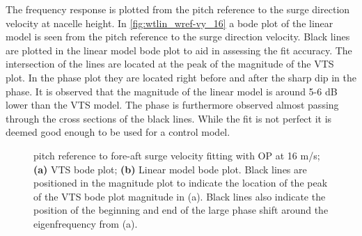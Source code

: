 The frequency response is plotted from the pitch reference to the surge direction velocity at nacelle height. In \cref{fig:wtlin_wref-vy_16} a bode plot of the linear model is seen from the pitch reference to the surge direction velocity. Black lines are plotted in the linear model bode plot to aid in assessing the fit accuracy. The intersection of the lines are located at the peak of the magnitude of the VTS plot. In the phase plot they are located right before and after the sharp dip in the phase. It is observed that the magnitude of the linear model is around 5-6 dB lower than the VTS model. The phase is furthermore observed almost passing through the cross sections of the black lines. While the fit is not perfect it is deemed good enough to be used for a control model.
\begin{figure}[ht]
	\centering
	
	\hfil
	
	\caption{pitch reference to fore-aft surge velocity fitting with OP at 16 m/s; \textbf{(a)} VTS bode plot; \textbf{(b)} Linear model bode plot. Black lines are positioned in the magnitude plot to indicate the location of the peak of the VTS bode plot magnitude in (a). Black lines also indicate the position of the beginning and end of the large phase shift around the eigenfrequency from (a).}
	\label{fig:wref-vy_16}
\end{figure}


